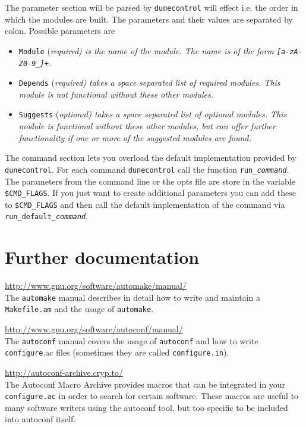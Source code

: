 \documentclass[11pt,a4paper,headinclude,footinclude,DIV16,normalheadings]{scrartcl}
\newcommand{\autoconf}{\texttt{autoconf}\xspace}
\newcommand{\automake}{\texttt{automake}\xspace}
\newcommand{\configure}{\texttt{configure}\xspace}
\newcommand{\configureac}{\texttt{configure.ac}\xspace}
\newcommand{\makefileam}{\texttt{Makefile.am}\xspace}
\newcommand{\dunecontrol}{\texttt{dunecontrol}\xspace}
\begin{document}
The parameter section will be parsed by \dunecontrol will effect
i.e. the order in which the modules are built. The parameters and
their values are separated by colon. Possible parameters are
\begin{itemize}
\item \texttt{Module} (\em required\em) is the name of the module. The
  name is of the form \texttt{[a-zA-Z0-9\_]+}.
\item \texttt{Depends} (\em required\em) takes a space separated list
  of required modules. This module is not functional without these
  other modules.
\item \texttt{Suggests} (\em optional\em) takes a space separated list
  of optional modules. This module is functional without these
  other modules, but can offer further functionality if one or more of
  the suggested modules are found.
\end{itemize}

The command section lets you overload the default implementation
provided by \dunecontrol. For each command \dunecontrol call the
function \texttt{run\_\textit{command}}. The parameters from the
command line or the opts file are store in the variable
\texttt{\$CMD\_FLAGS}. If you just want to create additional parameters
you can add these to \texttt{\$CMD\_FLAGS} and then call the default
implementation of the command via
\texttt{run\_default\_\textit{command}}.

\section{Further documentation}

\url{http://www.gnu.org/software/automake/manual/}\\
The \automake manual describes in detail how to write and maintain a
\makefileam and the usage of \automake.

\url{http://www.gnu.org/software/autoconf/manual/}\\
The \autoconf manual covers the usage of \autoconf and how to write
\configure.ac files (sometimes they are called \texttt{configure.in}).

\url{http://autoconf-archive.cryp.to/}\\
The Autoconf Macro Archive provides macros that can be integrated in
your \configureac in order to search for certain software. These
macros are useful to many software writers using the autoconf tool, but too
specific to be included into autoconf itself.
\end{document}

